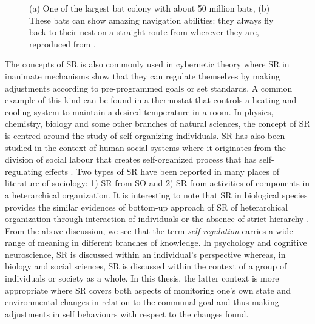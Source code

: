 \begin{figure}[htp]
\centering
{} 
\hspace{0.25cm}
\caption{(a) One of the largest bat colony with about 50 million bats, (b) These bats can show amazing navigation abilities: they always fly back to their nest on a straight route from wherever they are, reproduced from \protect{}.}
\label{fig:bats-colony}
\end{figure}
The concepts of SR is also commonly used in cybernetic theory where SR in inanimate mechanisms show that they can regulate themselves by making adjustments according to pre-programmed goals or set standards. A common example of this kind can be found in a thermostat that controls a heating and cooling system to maintain a desired temperature in a room. In physics, chemistry, biology and some other branches of natural sciences, the concept of SR is centred around the study of self-organizing individuals. SR has also been studied in the context of human social systems where it originates from the division of social labour that creates self-organized process that has self-regulating effects \cite{Kppers+1990}. Two types of SR have been reported in many places of literature of sociology: 1) SR from \ac{SO} and 2) SR from activities of components in a heterarchical organization. It is interesting to note that SR in biological species provides the similar evidences of bottom-up approach of SR of heterarchical organization through interaction of individuals or the absence of strict hierarchy \cite{Beer1981}.\\
From the above discussion, we see that the term {\em self-regulation} carries a wide range of meaning in different branches of knowledge. In psychology and cognitive neuroscience, SR is discussed within an individual's perspective whereas, in biology and social sciences, SR is discussed within the context of a group of individuals or society as a whole. In  this thesis, the latter context is more appropriate where  SR covers both aspects of monitoring one's own state and environmental changes in relation to the communal goal and thus making adjustments in self behaviours with respect to the changes found.
